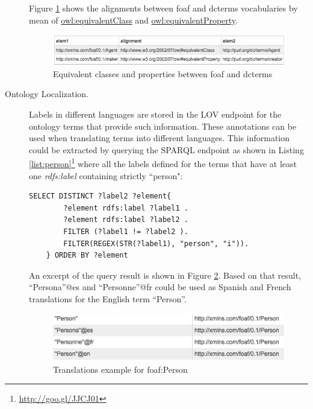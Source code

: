 \begin{description}
\begin{lstlisting}[float=htb,caption={SPARQL query asking for all the equivalent classes and properties between the vocabularies foaf and dcterms. },label=list:alignment]
	\end{lstlisting}
	
	Figure \ref{fig:eqCR} shows the alignments between foaf and dcterms vocabularies by mean of \url{owl:equivalentClass} and \url{owl:equivalentProperty}.
    \begin{figure}
      \centering
      \includegraphics[width=1.0\linewidth]{img/equivalentCandR.png}
      \caption{Equivalent classes and properties between foaf and dcterms}
      \label{fig:eqCR}
    \end{figure}

 \item [Ontology Localization.] Labels in different languages are stored in the LOV endpoint for the ontology terms that provide such information. These annotations can be used when translating terms into different languages. This information could be extracted by querying the SPARQL endpoint as shown in Listing \ref{list:person}\footnote{\url{http://goo.gl/JJCJ01}} where all the labels defined for the terms that have at least one \emph{rdfs:label} containing strictly ``person":
		
    \begin{lstlisting}[float=htb,caption={SPARQL query  for all the labels defined for the terms containing person. },label=list:person]
    SELECT DISTINCT ?label2 ?element{
		?element rdfs:label ?label1 .
		?element rdfs:label ?label2 .
		FILTER (?label1 != ?label2 ).
		FILTER(REGEX(STR(?label1), "person", "i")).
	} ORDER BY ?element
	\end{lstlisting}
							
   An excerpt of the query result is shown in Figure \ref{fig:translations}. Based on that result, ``Persona''@es and ``Personne''@fr could be used as Spanish and French translations for the English term ``Person''.
   \begin{figure}
     \centering
     \includegraphics[width=.90\linewidth]{img/translations1.png}
     \caption{Translations example for foaf:Person}
     \label{fig:translations}
   \end{figure}

\end{description}


